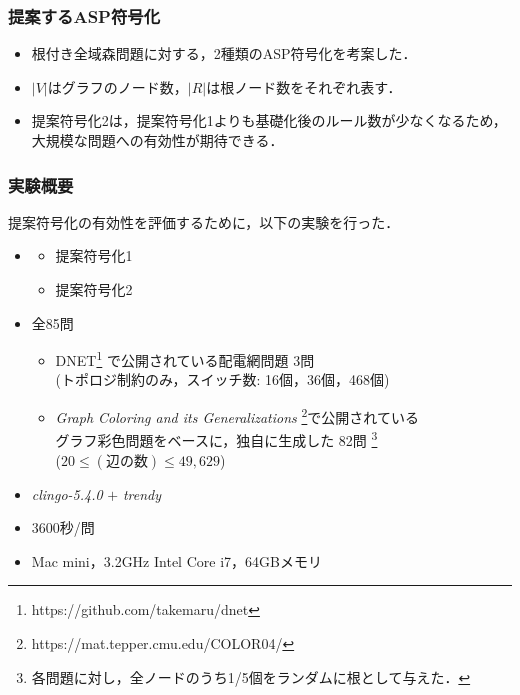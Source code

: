 \documentclass[dvipdfmx,11pt]{beamer}
\begin{document}
\begin{frame}\frametitle{提案するASP符号化}
 
\begin{itemize}
 \item  根付き全域森問題に対する，2種類のASP符号化を考案した．
 \item $|V|$はグラフのノード数，$|R|$は根ノード数をそれぞれ表す．
\end{itemize}
 
\begin{table}[t]
 \centering
 
\end{table}

 \begin{itemize}
  \item 提案符号化2は，提案符号化1よりも基礎化後のルール数が少なくなるため，
 		大規模な問題への有効性が期待できる．
 \end{itemize}
 
\end{frame}

\begin{frame}\frametitle{実験概要}
\renewcommand{\thefootnote}{\fnsymbol{footnote}}
\setcounter{footnote}{1}
提案符号化の有効性を評価するために，以下の実験を行った．

\begin{itemize}
 \item {}
	   \begin{itemize}
		\item 提案符号化1
		\item 提案符号化2
	   \end{itemize}
 \item {} 全85問
	   \begin{itemize}
		\item DNET\footnote{https://github.com/takemaru/dnet}%
			  で公開されている配電網問題 3問 \\ (トポロジ制約のみ，スイッチ数: 16個，36個，468個)
		\item \textit{Graph Coloring and its Generalizations}
			  \footnote{https://mat.tepper.cmu.edu/COLOR04/}で公開されている \\
			  グラフ彩色問題をベースに，独自に生成した 82問 
			  \footnote{各問題に対し，全ノードのうち1/5個をランダムに根として与えた．}\\
			  ($20 \leq (\textbf{辺の数}) \leq 49,629$)
	   \end{itemize}
 \item {} \textit{clingo-5.4.0} $+$ \textit{trendy}
 \item {} 3600秒/問
 \item {} Mac mini，3.2GHz Intel Core i7，64GBメモリ
\end{itemize}

\end{frame}
\end{document}
